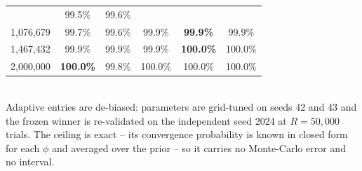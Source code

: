 \begin{table}[ht]
\begin{tabular}{rccccc}
& 99.5\%
& 99.6\% \\
1{,}076{,}679
& 99.7\%
& 99.6\%
& 99.9\%
& \textbf{99.9\%}
& 99.9\% \\
1{,}467{,}432
& 99.9\%
& 99.9\%
& 99.9\%
& \textbf{100.0\%}
& 100.0\% \\
2{,}000{,}000
& \textbf{100.0\%}
& 99.8\%
& 100.0\%
& 100.0\%
& 100.0\% \\
\bottomrule
\end{tabular}
\\[2pt]
\footnotesize Adaptive entries are de-biased: parameters are grid-tuned on seeds 42 and 43 and the frozen winner is re-validated on the independent seed 2024 at $R=50{,}000$ trials. The ceiling is exact -- its convergence probability is known in closed form for each $\phi$ and averaged over the prior -- so it carries no Monte-Carlo error and no interval.
\end{table}
